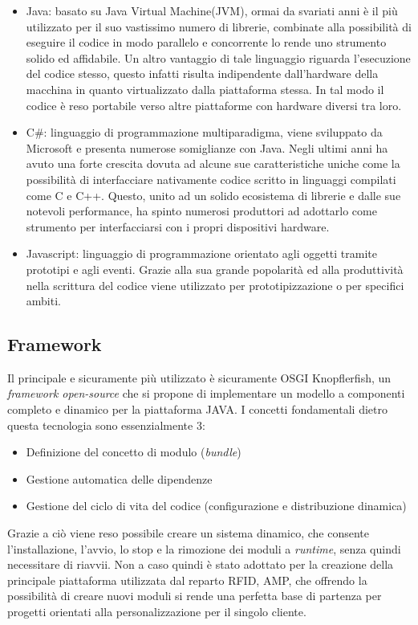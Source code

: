 \begin{itemize}
    \item Java: basato su Java Virtual Machine(JVM), ormai da svariati anni è il più utilizzato per il suo vastissimo numero di librerie, combinate alla possibilità di eseguire il codice in modo parallelo e concorrente
    lo rende uno strumento solido ed affidabile. Un altro vantaggio di tale linguaggio riguarda l'esecuzione del codice stesso, questo infatti risulta indipendente dall’hardware della macchina in quanto virtualizzato 
    dalla piattaforma stessa. In tal modo il codice è reso portabile verso altre piattaforme con hardware diversi tra loro.
    \item C\#: linguaggio di programmazione multiparadigma, viene sviluppato da Microsoft e presenta numerose somiglianze con Java. Negli ultimi anni ha avuto una forte crescita dovuta ad alcune sue caratteristiche uniche
    come la possibilità di interfacciare nativamente codice scritto in linguaggi compilati come C e C++. Questo, unito ad un solido ecosistema di librerie e dalle sue notevoli performance, ha spinto numerosi produttori ad 
    adottarlo come strumento per interfacciarsi con i propri dispositivi hardware.
    \item Javascript: linguaggio di programmazione orientato agli oggetti tramite prototipi e agli eventi. Grazie alla sua grande popolarità ed alla
    produttività nella scrittura del codice viene utilizzato per prototipizzazione o per specifici ambiti.
\end{itemize}

\subsection{Framework}

Il principale e sicuramente più utilizzato è sicuramente OSGI Knopflerfish, un \emph{framework open-source} che si propone di implementare 
un modello a componenti completo e dinamico per la piattaforma JAVA. I concetti fondamentali dietro questa tecnologia sono essenzialmente 3:
\begin{itemize}
    \item Definizione del concetto di modulo (\emph{bundle})
    \item Gestione automatica delle dipendenze
    \item Gestione del ciclo di vita del codice (configurazione e distribuzione dinamica)
\end{itemize}
Grazie a ciò viene reso possibile creare un sistema dinamico, che consente l'installazione, l'avvio, lo stop e la rimozione dei moduli a \emph{runtime}, 
senza quindi necessitare di riavvii. Non a caso quindi è stato adottato per la creazione della principale piattaforma utilizzata dal reparto RFID, AMP, 
che offrendo la possibilità di creare nuovi moduli si rende una perfetta base di partenza per progetti orientati alla personalizzazione per il singolo cliente. 

